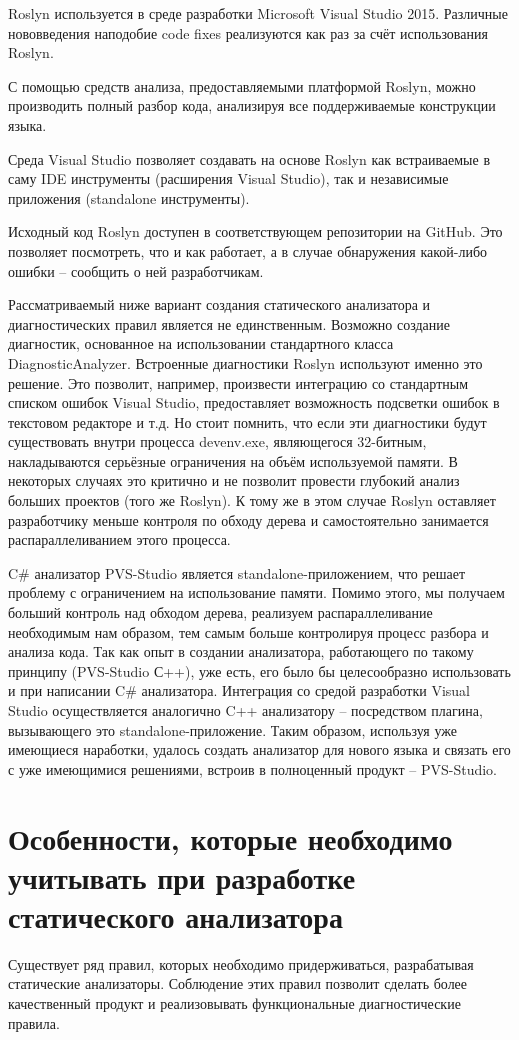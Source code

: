 \documentclass{article}
\begin{document}
Roslyn используется в среде разработки Microsoft Visual Studio 2015. Различные нововведения наподобие code fixes реализуются как раз за счёт использования Roslyn.

С помощью средств анализа, предоставляемыми платформой Roslyn, можно производить полный разбор кода, анализируя все поддерживаемые конструкции языка.

Среда Visual Studio позволяет создавать на основе Roslyn как встраиваемые в саму IDE инструменты (расширения Visual Studio), так и независимые приложения (standalone инструменты).

Исходный код Roslyn доступен в соответствующем репозитории на GitHub. Это позволяет посмотреть, что и как работает, а в случае обнаружения какой-либо ошибки – сообщить о ней разработчикам. 

Рассматриваемый ниже вариант создания статического анализатора и диагностических правил является не единственным. Возможно создание диагностик, основанное на использовании стандартного класса DiagnosticAnalyzer. Встроенные диагностики Roslyn используют именно это решение. Это позволит, например, произвести интеграцию со стандартным списком ошибок Visual Studio, предоставляет возможность подсветки ошибок в текстовом редакторе и т.д. Но стоит помнить, что если эти диагностики будут существовать внутри процесса devenv.exe, являющегося 32-битным, накладываются серьёзные ограничения на объём используемой памяти. В некоторых случаях это критично и не позволит провести глубокий анализ больших проектов (того же Roslyn). К тому же в этом случае Roslyn оставляет разработчику меньше контроля по обходу дерева и самостоятельно занимается распараллеливанием этого процесса. 

C# анализатор PVS-Studio является standalone-приложением, что решает проблему с ограничением на использование памяти. Помимо этого, мы получаем больший контроль над обходом дерева, реализуем распараллеливание необходимым нам образом, тем самым больше контролируя процесс разбора и анализа кода. Так как опыт в создании анализатора, работающего по такому принципу (PVS-Studio С++), уже есть, его было бы целесообразно использовать и при написании C# анализатора. Интеграция со средой разработки Visual Studio осуществляется аналогично C++ анализатору – посредством плагина, вызывающего это standalone-приложение. Таким образом, используя уже имеющиеся наработки, удалось создать анализатор для нового языка и связать его с уже имеющимися решениями, встроив в полноценный продукт – PVS-Studio.

\section{Особенности, которые необходимо учитывать при разработке статического анализатора}
Существует ряд правил, которых необходимо придерживаться, разрабатывая статические анализаторы. Соблюдение этих правил позволит сделать более качественный продукт и реализовывать функциональные диагностические правила.
\end{document}
